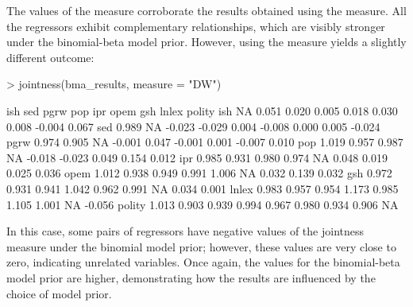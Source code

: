 \documentclass[a4paper]{article}
\begin{document}
The values of the \citet{Ley+2007} measure corroborate the results obtained using the \citet{Hofmarcher+2018} measure.
All the regressors exhibit complementary relationships, which are visibly stronger under the binomial-beta model prior.
However, using the \citet{Doppelhofer+2009} measure yields a slightly different outcome:
\begin{Schunk}
\begin{Sinput}
> jointness(bma_results, measure = "DW")
\end{Sinput}
\begin{Soutput}
         ish   sed   pgrw    pop    ipr   opem   gsh  lnlex polity
ish       NA 0.051  0.020  0.005  0.018  0.030 0.008 -0.004  0.067
sed    0.989    NA -0.023 -0.029  0.004 -0.008 0.000  0.005 -0.024
pgrw   0.974 0.905     NA -0.001  0.047 -0.001 0.001 -0.007  0.010
pop    1.019 0.957  0.987     NA -0.018 -0.023 0.049  0.154  0.012
ipr    0.985 0.931  0.980  0.974     NA  0.048 0.019  0.025  0.036
opem   1.012 0.938  0.949  0.991  1.006     NA 0.032  0.139  0.032
gsh    0.972 0.931  0.941  1.042  0.962  0.991    NA  0.034  0.001
lnlex  0.983 0.957  0.954  1.173  0.985  1.105 1.001     NA -0.056
polity 1.013 0.903  0.939  0.994  0.967  0.980 0.934  0.906     NA
\end{Soutput}
\end{Schunk}
In this case, some pairs of regressors have negative values of the jointness measure under the binomial model prior; however, these values are very close to zero, indicating unrelated variables.
Once again, the values for the binomial-beta model prior are higher, demonstrating how the results are influenced by the choice of model prior.
\end{document}
